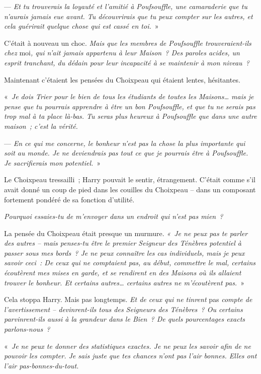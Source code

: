 --- \emph{Et tu trouverais la loyauté et l'amitié à Poufsouffle, une camaraderie que tu n'aurais jamais eue avant. Tu découvrirais que tu peux compter sur les autres, et cela guérirait quelque chose qui est cassé en toi.}~»

C'était à nouveau un choc. \emph{Mais que les membres de Poufsouffle trouveraient-ils chez} moi\emph{, qui n'ait jamais appartenu à leur Maison~? Des paroles acides, un esprit tranchant, du dédain pour leur incapacité à se maintenir à mon niveau~?}

Maintenant c'étaient les pensées du Choixpeau qui étaient lentes, hésitantes.

«~\emph{Je dois Trier pour le bien de tous les étudiants de toutes les Maisons… mais je pense que tu pourrais apprendre à être un bon Poufsouffle, et que tu ne serais pas trop mal à ta place là-bas. Tu seras plus heureux à Poufsouffle que dans une autre maison~; c'est la vérité.}

--- \emph{En ce qui me concerne, le bonheur n'est pas la chose la plus importante qui soit au monde. Je ne deviendrais pas tout ce que je pourrais être à Poufsouffle. Je sacrifierais mon potentiel.}~»

Le Choixpeau tressailli~; Harry pouvait le sentir, étrangement. C'était comme s'il avait donné un coup de pied dans les couilles du Choixpeau -- dans un composant fortement pondéré de sa fonction d'utilité.

\emph{Pourquoi essaies-tu de m'envoyer dans un endroit qui n'est pas mien~?}

La pensée du Choixpeau était presque un murmure. \emph{«~Je ne peux pas te parler des autres -- mais penses-tu être le premier Seigneur des Ténèbres potentiel à passer sous mes bords~? Je ne peux connaître les cas individuels, mais je peux savoir ceci~: De ceux qui ne comptaient pas, au début, commettre le mal, certains écoutèrent mes mises en garde, et se rendirent en des Maisons où ils allaient trouver le bonheur. Et certains autres… certains autres ne m'écoutèrent pas.}~»

Cela stoppa Harry. Mais pas longtemps. \emph{Et de ceux qui ne tinrent} pas \emph{compte de l'avertissement -- devinrent-ils tous des Seigneurs des Ténèbres~? Ou certains parvinrent-ils aussi à la grandeur dans le Bien~? De quels pourcentages exacts parlons-nous~?}

«~\emph{Je ne peux te donner des statistiques exactes. Je ne peux les savoir afin de ne pouvoir les compter. Je sais juste que tes chances n'ont pas l'air bonnes. Elles ont l'air pas-bonnes-du-tout.}

